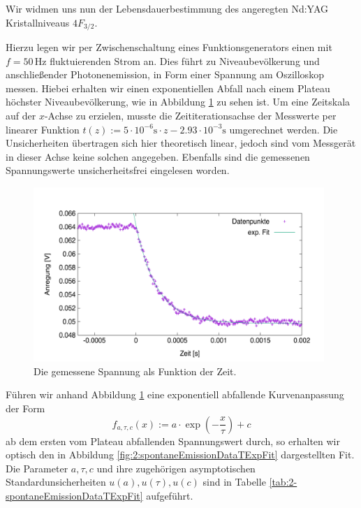 \documentclass[../../main.tex]{subfiles}
\begin{document}
    Wir widmen uns nun der Lebensdauerbestimmung des angeregten Nd:YAG Kristallniveaus $4F_{3/2}$. 

    Hierzu legen wir per Zwischenschaltung eines Funktionsgenerators einen mit $f = 50\,\si{\hertz}$ fluktuierenden Strom an. Dies führt zu Niveaubevölkerung und anschließender Photonenemission, in Form einer Spannung am Oszilloskop messen. Hiebei erhalten wir einen exponentiellen Abfall nach einem Plateau höchster Niveaubevölkerung, wie in Abbildung \ref{fig:2:spontaneEmissionDataT} zu sehen ist. Um eine Zeitskala auf der $x$-Achse zu erzielen, musste die Zeititerationsachse der Messwerte per linearer Funktion $t(z) := 5\cdot 10^{-6}\si{\s}\cdot z - 2.93\cdot 10^{-3}\si{\s}$ umgerechnet werden. Die Unsicherheiten übertragen sich hier theoretisch linear, jedoch sind vom Messgerät in dieser Achse keine solchen angegeben. Ebenfalls sind die gemessenen Spannungswerte unsicherheitsfrei eingelesen worden. 
    \begin{figure}[H]
        \centering
        \includegraphics[width=11cm]{../../Bilddateien/2/spontane_emission_data_t.png}
        \caption{Die gemessene Spannung als Funktion der Zeit.}
        \label{fig:2:spontaneEmissionDataT}
    \end{figure}
    Führen wir anhand Abbildung \ref{fig:2:spontaneEmissionDataT} eine exponentiell abfallende Kurvenanpassung der Form 
    \[
        f_{a,\tau,c}(x) := a\cdot \exp(-\frac{x}{\tau}) + c
    \]
    ab dem ersten vom Plateau abfallenden Spannungswert durch, so erhalten wir optisch den in Abbildung \ref{fig:2:spontaneEmissionDataTExpFit} dargestellten Fit. Die Parameter $a,\tau,c$ und ihre zugehörigen asymptotischen Standardunsicherheiten $u(a),u(\tau),u(c)$ sind in Tabelle \ref{tab:2-spontaneEmissionDataTExpFit} aufgeführt.
    
\end{document}

